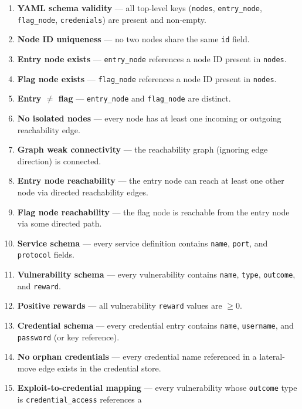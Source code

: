 \documentclass[11pt,a4paper]{article}
\begin{document}
\begin{enumerate}
    \item \textbf{YAML schema validity} — all top-level keys (\texttt{nodes},
          \texttt{entry\_node}, \texttt{flag\_node}, \texttt{credenials}) are
          present and non-empty.
    \item \textbf{Node ID uniqueness} — no two nodes share the same
          \texttt{id} field.
    \item \textbf{Entry node exists} — \texttt{entry\_node} references a node
          ID present in \texttt{nodes}.
    \item \textbf{Flag node exists} — \texttt{flag\_node} references a node
          ID present in \texttt{nodes}.
    \item \textbf{Entry $\neq$ flag} — \texttt{entry\_node} and
          \texttt{flag\_node} are distinct.
    \item \textbf{No isolated nodes} — every node has at least one incoming
          or outgoing reachability edge.
    \item \textbf{Graph weak connectivity} — the reachability graph (ignoring
          edge direction) is connected.
    \item \textbf{Entry node reachability} — the entry node can reach at
          least one other node via directed reachability edges.
    \item \textbf{Flag node reachability} — the flag node is reachable from
          the entry node via some directed path.
    \item \textbf{Service schema} — every service definition contains
          \texttt{name}, \texttt{port}, and \texttt{protocol} fields.
    \item \textbf{Vulnerability schema} — every vulnerability contains
          \texttt{name}, \texttt{type}, \texttt{outcome}, and \texttt{reward}.
    \item \textbf{Positive rewards} — all vulnerability \texttt{reward} values
          are $\geq 0$.
    \item \textbf{Credential schema} — every credential entry contains
          \texttt{name}, \texttt{username}, and \texttt{password} (or key
          reference).
    \item \textbf{No orphan credentials} — every credential name referenced
          in a lateral-move edge exists in the credential store.
    \item \textbf{Exploit-to-credential mapping} — every vulnerability whose
          \texttt{outcome} type is \texttt{credential\_access} references a

\end{enumerate}
\end{document}
